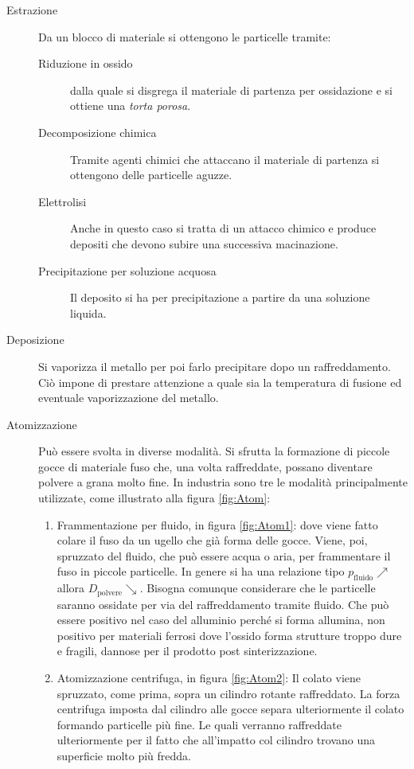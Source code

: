 \begin{description}
\item[Estrazione] Da un blocco di materiale si ottengono le particelle tramite:
	\begin{description}
	\item[Riduzione in ossido] dalla quale si disgrega il materiale di partenza per ossidazione e si ottiene una \textit{torta porosa}.
	\item[Decomposizione chimica] Tramite agenti chimici che attaccano il materiale di partenza si ottengono delle particelle aguzze.
	\item[Elettrolisi] Anche in questo caso si tratta di un attacco chimico e produce depositi che devono subire una successiva macinazione.
	\item[Precipitazione per soluzione acquosa] Il deposito si ha per precipitazione a partire da una soluzione liquida.
	\end{description}
\item[Deposizione] Si vaporizza il metallo per poi farlo precipitare dopo un raffreddamento. Ciò impone di prestare attenzione a quale sia la temperatura di fusione ed eventuale vaporizzazione del metallo.
\item[Atomizzazione] Può essere svolta in diverse modalità. Si sfrutta la formazione di piccole gocce di materiale fuso che, una volta raffreddate, possano diventare polvere a grana molto fine. 
In industria sono tre le modalità principalmente utilizzate, come illustrato alla figura \ref{fig:Atom}:
	\begin{enumerate}
	\item Frammentazione per fluido, in figura \ref{fig:Atom1}: dove viene fatto colare il fuso da un ugello che già forma delle gocce. Viene, poi, spruzzato del fluido, che può essere acqua o aria, per frammentare il fuso in piccole particelle. In genere si ha una relazione tipo $p_{\text{fluido}} \nearrow$ allora $D_{\text{polvere}} \searrow$.
	Bisogna comunque considerare che le particelle saranno ossidate per via del raffreddamento tramite fluido. Che può essere positivo nel caso del alluminio perché si forma allumina, non positivo per materiali ferrosi dove l'ossido forma strutture troppo dure e fragili, dannose per il prodotto post sinterizzazione.
	\item Atomizzazione centrifuga, in figura \ref{fig:Atom2}: Il colato viene spruzzato, come prima, sopra un cilindro rotante raffreddato. La forza centrifuga imposta dal cilindro alle gocce separa ulteriormente il colato formando particelle più fine. Le quali verranno raffreddate ulteriormente per il fatto che all'impatto col cilindro trovano una superficie molto più fredda.

\end{enumerate}
\end{description}
